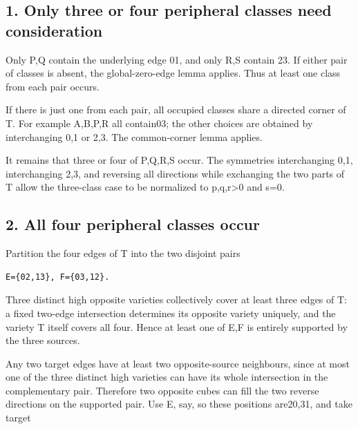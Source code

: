 \documentclass[
  10pt,
]{article}
\begin{document}
\hypertarget{only-three-or-four-peripheral-classes-need-consideration}{%
\subsection*{1. Only three or four peripheral classes need
consideration}\label{only-three-or-four-peripheral-classes-need-consideration}}

Only P,Q contain the underlying edge 01, and only R,S contain 23. If
either pair of classes is absent, the global-zero-edge lemma applies.
Thus at least one class from each pair occurs.

If there is just one from each pair, all occupied classes share a
directed corner of T. For example A,B,P,R all contain03; the other
choices are obtained by interchanging 0,1 or 2,3. The common-corner
lemma applies.

It remains that three or four of P,Q,R,S occur. The symmetries
interchanging 0,1, interchanging 2,3, and reversing all directions while
exchanging the two parts of T allow the three-class case to be
normalized to p,q,r\textgreater0 and s=0.

\hypertarget{all-four-peripheral-classes-occur}{%
\subsection*{2. All four peripheral classes
occur}\label{all-four-peripheral-classes-occur}}

Partition the four edges of T into the two disjoint pairs

\begin{verbatim}
E={02,13}, F={03,12}.
\end{verbatim}

Three distinct high opposite varieties collectively cover at least three
edges of T: a fixed two-edge intersection determines its opposite
variety uniquely, and the variety T itself covers all four. Hence at
least one of E,F is entirely supported by the three sources.

Any two target edges have at least two opposite-source neighbours, since
at most one of the three distinct high varieties can have its whole
intersection in the complementary pair. Therefore two opposite cubes can
fill the two reverse directions on the supported pair. Use E, say, so
these positions are20,31, and take target
\end{document}
